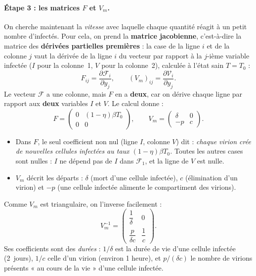 \documentclass[11pt,a4paper]{report}
\theoremstyle{plain}
\theoremstyle{definition}
\theoremstyle{remark}
\begin{document}
\paragraph{Étape 3 : les matrices $F$ et $V_m$.} On cherche maintenant la \emph{vitesse} avec laquelle chaque quantité réagit à un petit nombre d'infectés. Pour cela, on prend la \textbf{matrice jacobienne}, c'est-à-dire la matrice des \textbf{dérivées partielles premières} : la case de la ligne $i$ et de la colonne $j$ vaut la dérivée de la ligne $i$ du vecteur par rapport à la $j$-ième variable infectée ($I$ pour la colonne~1, $V$ pour la colonne~2), calculée à l'état sain $T=T_0$ :
$$F_{ij}=\frac{\partial\mathcal F_i}{\partial y_j},\qquad (V_m)_{ij}=\frac{\partial\mathcal V_i}{\partial y_j}.$$
Le vecteur $\mathcal F$ a une colonne, mais $F$ en a \textbf{deux}, car on dérive chaque ligne par rapport aux \textbf{deux} variables $I$ et $V$. Le calcul donne :
$$F=\begin{pmatrix}0&(1-\eta)\beta T_0\\0&0\end{pmatrix},\qquad V_m=\begin{pmatrix}\delta&0\\-p&c\end{pmatrix}.$$
\begin{itemize}
    \item Dans $F$, le seul coefficient non nul (ligne $I$, colonne $V$) dit : \emph{chaque virion crée de nouvelles cellules infectées au taux $(1-\eta)\beta T_0$.} Toutes les autres cases sont nulles : $I$ ne dépend pas de $I$ dans $\mathcal F_1$, et la ligne de $V$ est nulle.
    \item $V_m$ décrit les départs : $\delta$ (mort d'une cellule infectée), $c$ (élimination d'un virion) et $-p$ (une cellule infectée alimente le compartiment des virions).
\end{itemize}
Comme $V_m$ est triangulaire, on l'inverse facilement :
$$V_m^{-1}=\begin{pmatrix}\dfrac1\delta&0\\[6pt]\dfrac{p}{\delta c}&\dfrac1c\end{pmatrix}.$$
Ses coefficients sont des \emph{durées} : $1/\delta$ est la durée de vie d'une cellule infectée (2~jours), $1/c$ celle d'un virion (environ 1 heure), et $p/(\delta c)$ le nombre de virions présents « au cours de la vie » d'une cellule infectée.
\end{document}
